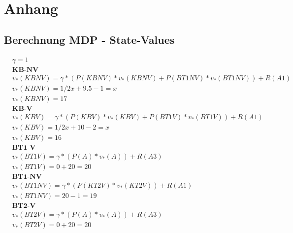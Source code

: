 \appendix
\chapter{Anhang}
\label{sec:Anhang}
\section{Berechnung MDP - State-Values}
\label{appendix:state-values}
\begin{align}
&\gamma=1\nonumber\\
&\textbf{KB-NV} \nonumber\\
&v_*(KBNV) =\gamma *( P(KBNV)* v_*(KBNV)+ P(BT1NV)* v_*(BT1NV))+R(A1) \nonumber \\
&v_*(KBNV)= 1/2x +  9.5 -1= x \nonumber\\
&v_*(KBNV)= 17\\
&\textbf{KB-V} \nonumber\\
&v_*(KBV)= \gamma *(P(KBV)* v_*(KBV)+ P(BT1V)* v_*(BT1V)) + R(A1) \nonumber \\
&v_*(KBV)= 1/2x +  10-2 = x \nonumber\\
&v_*(KBV)= 16\\
&\textbf{BT1-V} \nonumber\\
&v_*(BT1V)= \gamma *(P(A)* v_*(A)) + R(A3) \nonumber \\
&v_*(BT1V)= 0 +20 = 20\\
&\textbf{BT1-NV} \nonumber\\
&v_*(BT1NV) = \gamma *(P(KT2V)* v_*(KT2V))+R(A1) \nonumber \\
&v_*(BT1NV) = 20 -1= 19\\
&\textbf{BT2-V} \nonumber\\
&v_*(BT2V)= \gamma *(P(A)* v_*(A)) + R(A3) \nonumber \\
&v_*(BT2V)= 0 +20 = 20
\end{align}

